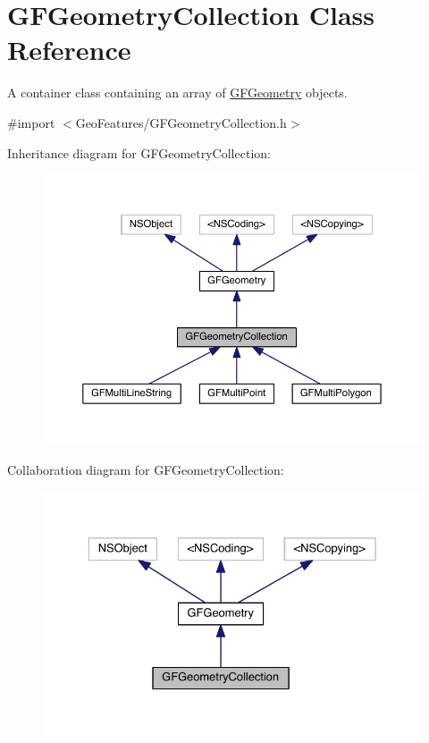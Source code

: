 \hypertarget{interface_g_f_geometry_collection}{}\section{G\+F\+Geometry\+Collection Class Reference}
\label{interface_g_f_geometry_collection}


A container class containing an array of \hyperlink{interface_g_f_geometry}{G\+F\+Geometry} objects.  




{\ttfamily \#import $<$Geo\+Features/\+G\+F\+Geometry\+Collection.\+h$>$}



Inheritance diagram for G\+F\+Geometry\+Collection\+:\nopagebreak
\begin{figure}[H]
\begin{center}
\leavevmode
\includegraphics[width=350pt]{interface_g_f_geometry_collection__inherit__graph}
\end{center}
\end{figure}


Collaboration diagram for G\+F\+Geometry\+Collection\+:\nopagebreak
\begin{figure}[H]
\begin{center}
\leavevmode
\includegraphics[width=329pt]{interface_g_f_geometry_collection__coll__graph}
\end{center}
\end{figure}
